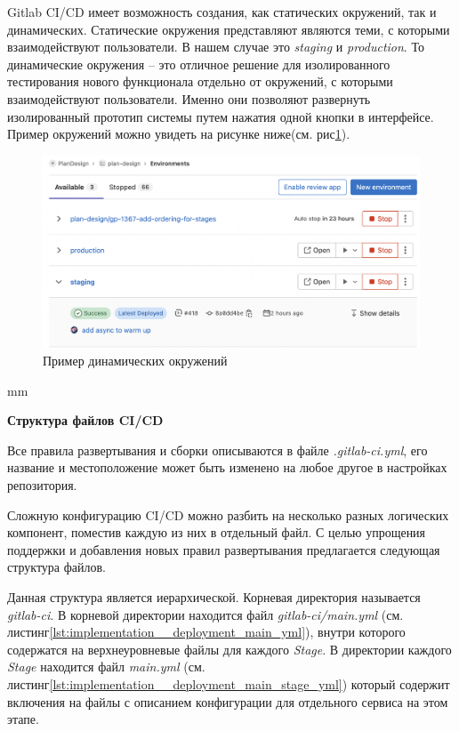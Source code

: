 Gitlab CI/CD имеет возможность создания, как статических окружений, так и динамических.
Статические окружения представляют являются теми, с которыми взаимодействуют пользователи.
В нашем случае это \textit{staging} и \textit{production}.
То динамические окружения -- это отличное решение для изолированного тестирования нового функционала
отдельно от окружений, с которыми взаимодействуют пользователи. Именно они позволяют развернуть
изолированный прототип системы путем нажатия одной кнопки в интерфейсе.
Пример окружений можно увидеть на рисунке ниже(см. рис\ref{pic:implementation__deployment-environment}).
\begin{figure}[H]
	\includegraphics[width=\textwidth]{implementation/pictures/deployment/environment}
	\caption{Пример динамических окружений}
	\label{pic:implementation__deployment-environment}
\end{figure}
 mm

\noindent \textbf{Структура файлов CI/CD}

Все правила развертывания и сборки описываются в файле \textit{.gitlab-ci.yml},
его название и местоположение может быть изменено на любое другое в настройках репозитория.

Сложную конфигурацию CI/CD можно разбить на несколько разных логических компонент, поместив каждую из них
в отдельный файл.
С целью упрощения поддержки и добавления новых правил развертывания предлагается следующая структура файлов.


\vskip 5mm
Данная структура является иерархической.
Корневая директория называется \textit{gitlab-ci}. В корневой директории находится файл
\textit{gitlab-ci/main.yml}
(см. листинг\ref{lst:implementation__deployment_main_yml}),
внутри которого содержатся на верхнеуровневые файлы для каждого \textit{Stage}.
В директории каждого \textit{Stage} находится файл \textit{main.yml} (см. листинг\ref{lst:implementation__deployment_main_stage_yml})
который содержит включения на файлы
с описанием конфигурации для отдельного сервиса на этом этапе.

